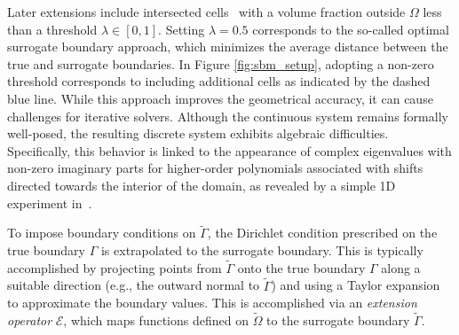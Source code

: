 \documentclass{elsarticle}
\begin{document}
Later extensions include intersected cells~\cite{yang2024optimal} with a volume fraction outside $\Omega$ less than a
threshold $\lambda\in [0,1]$. Setting $\lambda = 0.5$ corresponds to the so-called optimal surrogate boundary approach,
which minimizes the average distance between the true and surrogate boundaries. In Figure \ref{fig:sbm_setup}, adopting
a non-zero threshold corresponds to including additional cells as indicated by the dashed blue line. While this
approach improves the geometrical accuracy, it can cause challenges for iterative solvers. Although the continuous
system remains formally well-posed, the resulting discrete system exhibits algebraic difficulties. Specifically, this
behavior is linked to the appearance of complex eigenvalues with non-zero imaginary parts for higher-order polynomials
associated with shifts directed towards the interior of the domain, as revealed by a simple 1D experiment
in~\cite{wichrowski2025geometric}.

To impose boundary conditions on $\tilde{\Gamma}$, the Dirichlet condition prescribed on the true boundary $\Gamma$ is
extrapolated to the surrogate boundary. This is typically accomplished by projecting points from $\tilde{\Gamma}$ onto
the true boundary $\Gamma$ along a suitable direction (e.g., the outward normal to $\tilde{\Gamma}$) and using a Taylor
expansion to approximate the boundary values. This is accomplished via an \emph{extension operator} $\mathcal{E}$,
which maps functions defined on $\tilde{\Omega}$ to the surrogate boundary $\tilde{\Gamma}$.
\end{document}
